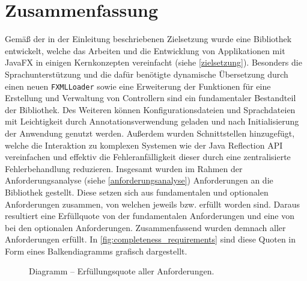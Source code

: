 \section{Zusammenfassung}
\label{zusammenfassung}
Gemäß der in der Einleitung beschriebenen Zielsetzung wurde eine Bibliothek entwickelt, welche das Arbeiten und die Entwicklung von Applikationen mit JavaFX in einigen Kernkonzepten vereinfacht (siehe \autoref{zielsetzung}). Besonders die Sprachunterstützung und die dafür benötigte dynamische Übersetzung durch einen neuen \texttt{FXMLLoader} sowie eine Erweiterung der Funktionen für eine Erstellung und Verwaltung von Controllern sind ein fundamentaler Bestandteil der Bibliothek. Des Weiteren können Konfigurationsdateien und Sprachdateien mit Leichtigkeit durch Annotationsverwendung geladen und nach Initialisierung der Anwendung genutzt werden. Außerdem wurden Schnittstellen hinzugefügt, welche die Interaktion zu komplexen Systemen wie der Java Reflection API vereinfachen und effektiv die Fehleranfälligkeit dieser durch eine zentralisierte Fehlerbehandlung reduzieren. Insgesamt wurden im Rahmen der Anforderungsanalyse (siehe \autoref{anforderungsanalyse}) \thereq{} Anforderungen an die Bibliothek gestellt. Diese setzen sich aus \thereqFunAmount{} fundamentalen und \thereqOptAmount{} optionalen Anforderungen zusammen, von welchen jeweils \thereqFunCompleted{} bzw. \thereqOptCompleted{} erfüllt worden sind. Daraus resultiert eine Erfüllquote von \CalculatePercentage{\thereqFunCompleted}{\thereqFunAmount} der fundamentalen Anforderungen und eine von \CalculatePercentage{\thereqOptCompleted}{\thereqOptAmount} bei den optionalen Anforderungen. Zusammenfassend wurden demnach \CalculatePercentage{\thereqTotalCompleted}{\thereq} aller Anforderungen erfüllt. In \autoref{fig:completeness_requirements} sind diese Quoten in Form eines Balkendiagramms grafisch dargestellt.
\begin{figure}[H]
	\centering
	\caption{Diagramm -- Erfüllungsquote aller Anforderungen.}
	\label{fig:completeness_requirements}
\end{figure}

